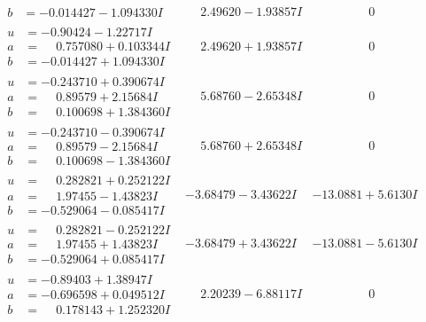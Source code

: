 \documentclass[1p]{elsarticle_modified}
\theoremstyle{definition}
\begin{document}
$$\begin{array}{c|c|c}
\begin{aligned}
b &= -0.014427 - 1.094330 I\end{aligned}
 & \phantom{-}2.49620 - 1.93857 I & \phantom{-0.000000 } 0 \\ \hline\begin{aligned}
u &= -0.90424 - 1.22717 I \\
a &= \phantom{-}0.757080 + 0.103344 I \\
b &= -0.014427 + 1.094330 I\end{aligned}
 & \phantom{-}2.49620 + 1.93857 I & \phantom{-0.000000 } 0 \\ \hline\begin{aligned}
u &= -0.243710 + 0.390674 I \\
a &= \phantom{-}0.89579 + 2.15684 I \\
b &= \phantom{-}0.100698 + 1.384360 I\end{aligned}
 & \phantom{-}5.68760 - 2.65348 I & \phantom{-0.000000 } 0 \\ \hline\begin{aligned}
u &= -0.243710 - 0.390674 I \\
a &= \phantom{-}0.89579 - 2.15684 I \\
b &= \phantom{-}0.100698 - 1.384360 I\end{aligned}
 & \phantom{-}5.68760 + 2.65348 I & \phantom{-0.000000 } 0 \\ \hline\begin{aligned}
u &= \phantom{-}0.282821 + 0.252122 I \\
a &= \phantom{-}1.97455 - 1.43823 I \\
b &= -0.529064 - 0.085417 I\end{aligned}
 & -3.68479 - 3.43622 I & -13.0881 + 5.6130 I \\ \hline\begin{aligned}
u &= \phantom{-}0.282821 - 0.252122 I \\
a &= \phantom{-}1.97455 + 1.43823 I \\
b &= -0.529064 + 0.085417 I\end{aligned}
 & -3.68479 + 3.43622 I & -13.0881 - 5.6130 I \\ \hline\begin{aligned}
u &= -0.89403 + 1.38947 I \\
a &= -0.696598 + 0.049512 I \\
b &= \phantom{-}0.178143 + 1.252320 I\end{aligned}
 & \phantom{-}2.20239 - 6.88117 I & \phantom{-0.000000 } 0 \\ \hline\begin{aligned}

\end{aligned}
\end{array}$$
\end{document}
